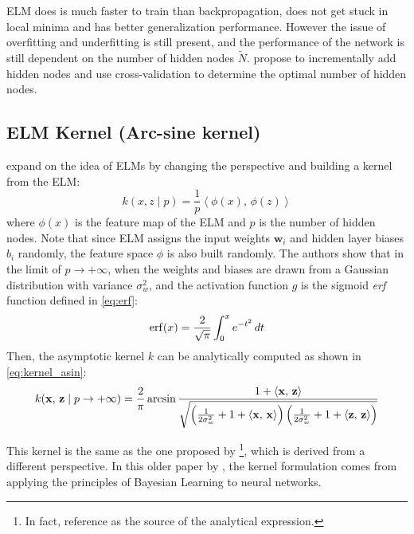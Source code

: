 ELM does is much faster to train than backpropagation, does not get stuck in local minima
and has better generalization performance. However the issue of overfitting and underfitting
is still present, and the performance of the network is still dependent on the number of
hidden nodes $\tilde{N}$. \Textcite{huangExtremeLearningMachine2012} propose to incrementally
add hidden nodes and use cross-validation to determine the optimal number of hidden nodes.

\subsection{ELM Kernel (Arc-sine kernel)}%

\Textcite{frenayParameterinsensitiveKernelExtreme2011} expand on the idea of ELMs \cite{huangExtremeLearningMachine2006,huangExtremeLearningMachine2012}
by changing the perspective and building a kernel from the ELM:
\begin{equation}
    k(x, z \mid p) = \frac{1}{p}\left\langle \phi(x),\,\phi(z) \right\rangle
\end{equation}
where $\phi(x)$ is the feature map of the ELM and $p$ is the number of hidden nodes. Note
that since ELM assigns the input weights $\textbf{w}_i$ and hidden layer biases $b_i$ randomly,
the feature space $\phi$ is also built randomly. The authors show that in the limit of $p \to +\infty$,
when the weights and biases are drawn from a Gaussian distribution with variance $\sigma_w^2$, and
the activation function $g$ is the sigmoid \emph{erf} function defined in \cref{eq:erf}:
\begin{equation}\label{eq:erf}
    \operatorname{erf}(x) = \frac{2}{\sqrt{\pi}} \int_0^x e^{-t^2} \,dt
\end{equation}
Then, the
asymptotic kernel $k$ can be analytically computed as shown in \cref{eq:kernel_asin}:
\begin{equation}\label{eq:kernel_asin}
	k(\mathbf{x},\,\mathbf{z} \mid p \to + \infty)  = \frac{2}{\pi}
	\arcsin \frac{1 + \left\langle \mathbf{x},\,\mathbf{z} \right\rangle}{\sqrt{
			\left(
			\frac{1}{2\sigma_w^2} + 1 + \left\langle \mathbf{x},\,\mathbf{x} \right\rangle
			\right)
			\left(
			\frac{1}{2\sigma_w^2} + 1 + \left\langle \mathbf{z},\,\mathbf{z} \right\rangle
			\right)
		}}
\end{equation}

This kernel is the same as the one proposed by \textcite{williamsComputationInfiniteNeural1998}\footnote{
    In fact, \textcite{frenayParameterinsensitiveKernelExtreme2011} reference \textcite{williamsComputationInfiniteNeural1998} as the source of the analytical
expression.}, which is derived from a different perspective.
In this older paper by \citeauthor{williamsComputationInfiniteNeural1998}, the kernel formulation comes from
applying the principles of Bayesian Learning to neural networks\cite{nealBayesianLearningNeural1996,bishopBayesianNeuralNetworks1997}.

